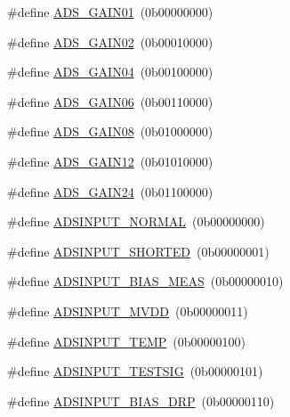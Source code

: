 \begin{DoxyCompactItemize}
\item 
\#define \hyperlink{group___definitions___a_d_s1299_ga90434647d646bb26523c4c011adbe9d3}{A\+D\+S\+\_\+\+G\+A\+I\+N01}~(0b00000000)
\item 
\#define \hyperlink{group___definitions___a_d_s1299_ga9c08639e5c0ef9882fc8510754396efc}{A\+D\+S\+\_\+\+G\+A\+I\+N02}~(0b00010000)
\item 
\#define \hyperlink{group___definitions___a_d_s1299_ga239d9580d404da48fc22e471ec00bb29}{A\+D\+S\+\_\+\+G\+A\+I\+N04}~(0b00100000)
\item 
\#define \hyperlink{group___definitions___a_d_s1299_ga9545f6eda49aa7cc2ca4e770a0db5e24}{A\+D\+S\+\_\+\+G\+A\+I\+N06}~(0b00110000)
\item 
\#define \hyperlink{group___definitions___a_d_s1299_ga234dd100d017d7d39304ceef768a7d56}{A\+D\+S\+\_\+\+G\+A\+I\+N08}~(0b01000000)
\item 
\#define \hyperlink{group___definitions___a_d_s1299_gaf51364bd52278c2ed4ac4a59a6a553dc}{A\+D\+S\+\_\+\+G\+A\+I\+N12}~(0b01010000)
\item 
\#define \hyperlink{group___definitions___a_d_s1299_ga9718ed648c7228fb84a752c7b39514d8}{A\+D\+S\+\_\+\+G\+A\+I\+N24}~(0b01100000)
\item 
\#define \hyperlink{group___definitions___a_d_s1299_ga79a404120ad83a16e3ae5604e1d574c7}{A\+D\+S\+I\+N\+P\+U\+T\+\_\+\+N\+O\+R\+M\+A\+L}~(0b00000000)
\item 
\#define \hyperlink{group___definitions___a_d_s1299_gaf4819c6799cebfab368ca7aca44dbb61}{A\+D\+S\+I\+N\+P\+U\+T\+\_\+\+S\+H\+O\+R\+T\+E\+D}~(0b00000001)
\item 
\#define \hyperlink{group___definitions___a_d_s1299_ga7bab91512236b30be9285da48d5ce360}{A\+D\+S\+I\+N\+P\+U\+T\+\_\+\+B\+I\+A\+S\+\_\+\+M\+E\+A\+S}~(0b00000010)
\item 
\#define \hyperlink{group___definitions___a_d_s1299_gaca41b0b85d6a23cdf5d528ccb1ddd745}{A\+D\+S\+I\+N\+P\+U\+T\+\_\+\+M\+V\+D\+D}~(0b00000011)
\item 
\#define \hyperlink{group___definitions___a_d_s1299_ga835a4b6ea1a22c4b8021e0d47a43344a}{A\+D\+S\+I\+N\+P\+U\+T\+\_\+\+T\+E\+M\+P}~(0b00000100)
\item 
\#define \hyperlink{group___definitions___a_d_s1299_ga8894379ee3e97a0e296d0201fe75c1b8}{A\+D\+S\+I\+N\+P\+U\+T\+\_\+\+T\+E\+S\+T\+S\+I\+G}~(0b00000101)
\item 
\#define \hyperlink{group___definitions___a_d_s1299_ga96b333a3e8d417e7e3980abec3168353}{A\+D\+S\+I\+N\+P\+U\+T\+\_\+\+B\+I\+A\+S\+\_\+\+D\+R\+P}~(0b00000110)

\end{DoxyCompactItemize}
